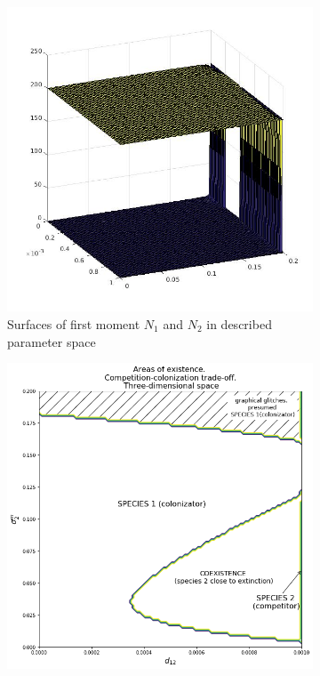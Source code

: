 \documentclass[%
 aip,
rsi,%
 amsmath,amssymb,
 reprint,%
]{revtex4-1}
\begin{document}
\begin{figure}
\centering
\begin{subfigure}{.5\textwidth}
  \centering
  \includegraphics[width=.95\linewidth]{N1N2cctoD3.jpg}
  \caption{Surfaces of first moment \(N_1\) and \(N_2\) in described parameter space}
  \label{fig:cctod3:sub1}
\end{subfigure}%
\begin{subfigure}{.5\textwidth}
  \centering
  \includegraphics[width=.95\linewidth]{arccto08d3.png}

\end{subfigure}
\end{figure}
\end{document}
